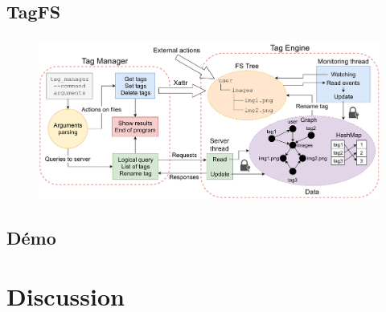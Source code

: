 \documentclass[10pt]{beamer}
\begin{document}
\subsection{TagFS}
\begin{frame}
    \frametitle{\subsecname}
    \begin{figure}
        \begin{center}
            \includegraphics[width=1\textwidth]{images/tagfs4.png}
        \end{center}
    \end{figure}
\end{frame}

\subsection{Démo}
\begin{frame}
    \frametitle{\subsecname}
\end{frame}

\section{Discussion}
\end{document}

